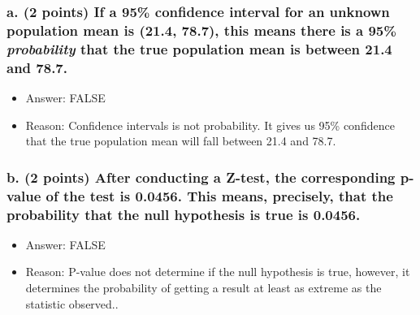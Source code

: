 \documentclass[
]{article}
\providecommand{\tightlist}{%
  \setlength{\itemsep}{0pt}\setlength{\parskip}{0pt}}
\begin{document}
\hypertarget{a.-2-points-if-a-95-confidence-interval-for-an-unknown-population-mean-is-21.4-78.7-this-means-there-is-a-95-probability-that-the-true-population-mean-is-between-21.4-and-78.7.}{%
\subsubsection{\texorpdfstring{a. (2 points) If a 95\% confidence
interval for an unknown population mean is (21.4, 78.7), this means
there is a 95\% \emph{probability} that the true population mean is
between 21.4 and
78.7.}{a. (2 points) If a 95\% confidence interval for an unknown population mean is (21.4, 78.7), this means there is a 95\% probability that the true population mean is between 21.4 and 78.7.}}\label{a.-2-points-if-a-95-confidence-interval-for-an-unknown-population-mean-is-21.4-78.7-this-means-there-is-a-95-probability-that-the-true-population-mean-is-between-21.4-and-78.7.}}

\begin{itemize}
\tightlist
\item
  Answer: FALSE
\item
  Reason: Confidence intervals is not probability. It gives us 95\%
  confidence that the true population mean will fall between 21.4 and
  78.7.
\end{itemize}

\hypertarget{b.-2-points-after-conducting-a-z-test-the-corresponding-p-value-of-the-test-is-0.0456.-this-means-precisely-that-the-probability-that-the-null-hypothesis-is-true-is-0.0456.}{%
\subsubsection{b. (2 points) After conducting a Z-test, the
corresponding p-value of the test is 0.0456. This means, precisely, that
the probability that the null hypothesis is true is
0.0456.}\label{b.-2-points-after-conducting-a-z-test-the-corresponding-p-value-of-the-test-is-0.0456.-this-means-precisely-that-the-probability-that-the-null-hypothesis-is-true-is-0.0456.}}

\begin{itemize}
\tightlist
\item
  Answer: FALSE
\item
  Reason: P-value does not determine if the null hypothesis is true,
  however, it determines the probability of getting a result at least as
  extreme as the statistic observed..
\end{itemize}
\end{document}
